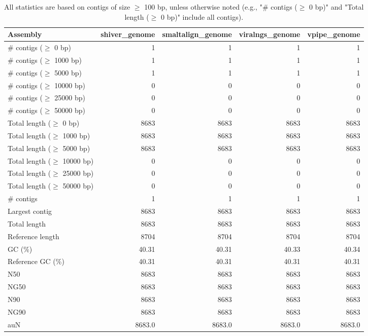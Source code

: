 \documentclass[12pt,a4paper]{article}
\begin{document}
\begin{table}[ht]
\begin{center}
\caption{All statistics are based on contigs of size $\geq$ 100 bp, unless otherwise noted (e.g., "\# contigs ($\geq$ 0 bp)" and "Total length ($\geq$ 0 bp)" include all contigs).}
\begin{tabular}{|l*{4}{|r}|}
\hline
Assembly & shiver\_genome & smaltalign\_genome & viralngs\_genome & vpipe\_genome \\ \hline
\# contigs ($\geq$ 0 bp) & 1 & 1 & 1 & 1 \\ \hline
\# contigs ($\geq$ 1000 bp) & 1 & 1 & 1 & 1 \\ \hline
\# contigs ($\geq$ 5000 bp) & 1 & 1 & 1 & 1 \\ \hline
\# contigs ($\geq$ 10000 bp) & 0 & 0 & 0 & 0 \\ \hline
\# contigs ($\geq$ 25000 bp) & 0 & 0 & 0 & 0 \\ \hline
\# contigs ($\geq$ 50000 bp) & 0 & 0 & 0 & 0 \\ \hline
Total length ($\geq$ 0 bp) & 8683 & 8683 & 8683 & 8683 \\ \hline
Total length ($\geq$ 1000 bp) & 8683 & 8683 & 8683 & 8683 \\ \hline
Total length ($\geq$ 5000 bp) & 8683 & 8683 & 8683 & 8683 \\ \hline
Total length ($\geq$ 10000 bp) & 0 & 0 & 0 & 0 \\ \hline
Total length ($\geq$ 25000 bp) & 0 & 0 & 0 & 0 \\ \hline
Total length ($\geq$ 50000 bp) & 0 & 0 & 0 & 0 \\ \hline
\# contigs & 1 & 1 & 1 & 1 \\ \hline
Largest contig & 8683 & 8683 & 8683 & 8683 \\ \hline
Total length & 8683 & 8683 & 8683 & 8683 \\ \hline
Reference length & 8704 & 8704 & 8704 & 8704 \\ \hline
GC (\%) & 40.31 & 40.31 & 40.33 & 40.34 \\ \hline
Reference GC (\%) & 40.31 & 40.31 & 40.31 & 40.31 \\ \hline
N50 & 8683 & 8683 & 8683 & 8683 \\ \hline
NG50 & 8683 & 8683 & 8683 & 8683 \\ \hline
N90 & 8683 & 8683 & 8683 & 8683 \\ \hline
NG90 & 8683 & 8683 & 8683 & 8683 \\ \hline
auN & 8683.0 & 8683.0 & 8683.0 & 8683.0 \\ \hline

\end{tabular}
\end{center}
\end{table}
\end{document}

